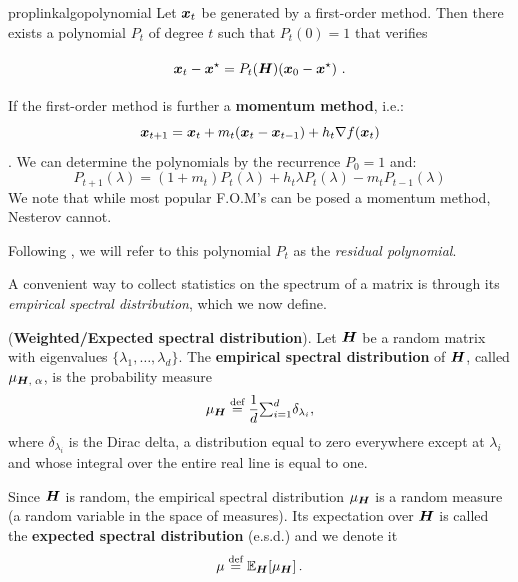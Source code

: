 \documentclass{article}
\begin{document}
\begin{restatable}{prop}{linkalgopolynomial}
    \label{prop:link_algo_polynomial} \parencite{hestenes1952methods}
    Let ${\boldsymbol x}_t$ be generated by a first-order method. Then there exists a polynomial $P_t$ of degree $t$ such that $P_t(0) = 1$ that verifies
    \begin{equation}\label{eq:polynomial_iterates}
        \vphantom{\sum^n}{\boldsymbol x}_{t}-{\boldsymbol x}^\star = P_t({\boldsymbol H})({\boldsymbol x}_0-{\boldsymbol x}^\star)~.
    \end{equation}
\end{restatable}

\begin{remark} \label{rmk: momentum based}
If the first-order method is further a \textbf{momentum method}, i.e.:
$$
    {\boldsymbol x}_{t+1}={\boldsymbol x}_t+m_t({\boldsymbol x}_t-{\boldsymbol x}_{t-1})+h_t\nabla f({\boldsymbol x}_t)
$$.
We can determine the polynomials by the recurrence $P_0=1$ and:
    \begin{equation*}
        P_{t+1}(\lambda)=(1+m_t)P_t(\lambda)+h_t\lambda P_t(\lambda)-m_tP_{t-1}(\lambda)
    \end{equation*}
We note that while most popular F.O.M's can be posed a momentum method, Nesterov cannot.
\end{remark}

Following \textcite{fischer1996polynomial}, we will refer to this polynomial $P_t$ as the \emph{residual polynomial}.




A convenient way to collect statistics on the spectrum of a matrix is through its \emph{empirical spectral distribution}, which we now define. 


\begin{definition}
(\textbf{Weighted/Expected spectral distribution}). 
Let ${\boldsymbol H}$ be a random matrix with eigenvalues $\{\lambda_1, \ldots, \lambda_d\}$. The \textbf{empirical spectral distribution} of ${\boldsymbol H}$, called ${\mu}_{{\boldsymbol H},\;\alpha}$, is the probability measure
\begin{equation}\label{eq:wighted_spectral_density}
    \mu_{{\boldsymbol H}} \stackrel{\text{def}}{=} \frac{1}{d}{\textstyle{\sum_{i=1}^d}} \delta_{\lambda_i},
\end{equation}
where $\delta_{\lambda_i}$ is the Dirac delta, a distribution equal to zero everywhere except at $\lambda_i$ and whose integral over the entire real line is equal to one.

Since ${\boldsymbol H}$ is random, the empirical spectral distribution $\mu_{\boldsymbol H}$ is a random measure (a random variable in the space of measures). Its expectation over ${\boldsymbol H}$ is called the \textbf{expected spectral distribution} (e.s.d.) and we denote it
\begin{equation}
\mu \stackrel{\text{def}}{=} {\mathbb{E}}_{{\boldsymbol H}}[\mu_{{\boldsymbol H}}]\,.
\end{equation}
\end{definition}
\end{document}
